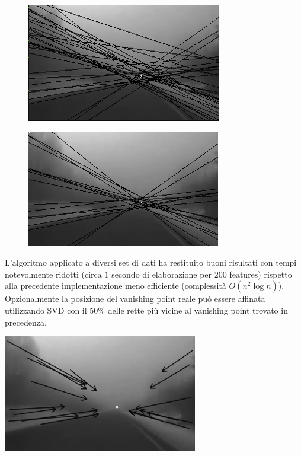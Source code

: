 \documentclass[12pt]{report}
\begin{document}
\begin{figure}
	\begin{minipage}[b]{0.5\linewidth}
		\centering
		\includegraphics[scale=0.6]{images/iaasBefore.png}
		\label{fig:vpBef}
	\end{minipage}
	\hspace{0.5cm}
	\begin{minipage}[b]{0.5\linewidth}
		\centering
		\includegraphics[scale=0.6]{images/iaasAfter.png}
		\label{fig:vpAft}
	\end{minipage}
\end{figure}

\noindent L'algoritmo applicato a diversi set di dati ha restituito buoni risultati con tempi notevolmente ridotti (circa $1$ secondo di elaborazione per $200$ features) rispetto alla precedente implementazione meno efficiente (complessit\`a $O\left(n^2\log{n}\right)$).\\

\noindent Opzionalmente la posizione del vanishing point reale pu\`o essere affinata utilizzando SVD con il $50\%$ delle rette pi\`u vicine al vanishing point trovato in precedenza.\\

\begin{center}
	\includegraphics[scale=0.50]{images/iaasAfterArrow.png}
	\label{fig:vpAftArr}
\end{center}
\end{document}
